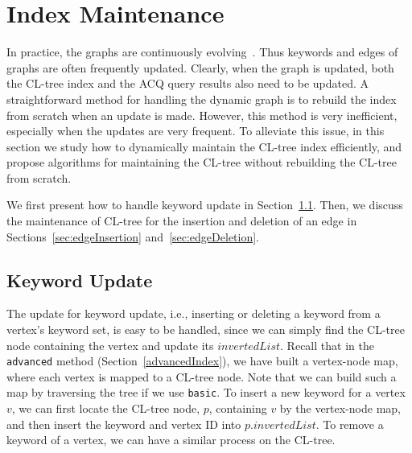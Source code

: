 {\color{blue}
\section{Index Maintenance}
\label{indexMaintenance}

In practice, the graphs are continuously evolving~\cite{chenghui,kddEvolving}.
Thus keywords and edges of graphs are often frequently updated.
Clearly, when the graph is updated, both the CL-tree index and the ACQ query results also need to be updated.
A straightforward method for handling the dynamic graph is to rebuild the index from scratch when an update is made.
However, this method is very inefficient, especially when the updates are very frequent.
To alleviate this issue, in this section we study how to dynamically maintain the CL-tree index efficiently,
and propose algorithms for maintaining the CL-tree without rebuilding the CL-tree from scratch.

We first present how to handle keyword update in Section~\ref{sec:keyword}.
Then, we discuss the maintenance of CL-tree for the insertion and deletion of an edge in Sections~\ref{sec:edgeInsertion} and~\ref{sec:edgeDeletion}.

\subsection{Keyword Update}
\label{sec:keyword}

The update for keyword update, i.e., inserting or deleting a keyword from a vertex's keyword set, is easy to be handled, since we can simply find the CL-tree node containing the vertex and update its $invertedList$.
Recall that in the {\tt advanced} method (Section~\ref{advancedIndex}), we have built a vertex-node map, where each vertex is mapped to a CL-tree node. Note that we can build such a map by traversing the tree if we use {\tt basic}.
To insert a new keyword for a vertex $v$, we can first locate the CL-tree node, $p$, containing $v$ by the vertex-node map, and then insert the keyword and vertex ID into $p.invertedList$. To remove a keyword of a vertex, we can have a similar process on the CL-tree.




} 
